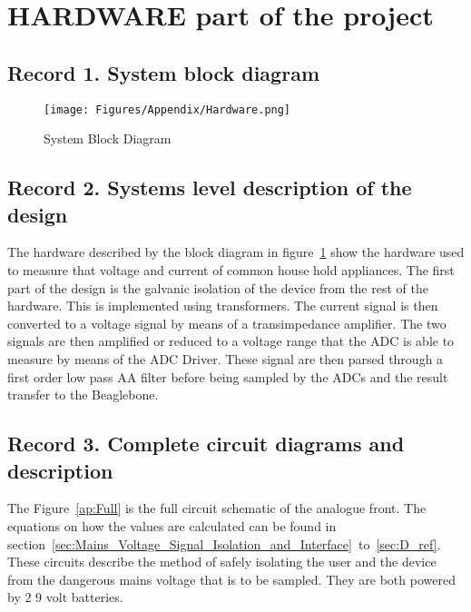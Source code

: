 
\section{HARDWARE part of the project}

\subsection{Record 1. System block diagram}

\begin{figure}[H]
    \centering
    \texttt{[image: Figures/Appendix/Hardware.png]}
    \caption{System Block Diagram}
    \label{fig:Hardware}
\end{figure}


\subsection{Record 2.  Systems level description of the design}

The hardware described by the block diagram in figure~\ref{fig:Hardware} show the hardware used to measure that voltage and current of common house hold appliances. The first part of the design is the galvanic isolation of the device from the rest of the hardware. This is implemented using transformers. The current signal is then converted to a voltage signal by means of a transimpedance amplifier. The two signals are then amplified or reduced to a voltage range that the ADC is able to measure by means of the ADC Driver. These signal are then parsed through a first order low pass AA filter before being sampled by the ADCs and the result transfer to the Beaglebone.


\subsection{Record 3. Complete circuit diagrams and description}


The Figure~\ref{ap:Full} is the full circuit schematic of the analogue front. The equations on how the values are calculated can be found in section~\ref{sec:Mains_Voltage_Signal_Isolation_and_Interface}~to~\ref{sec:D_ref}. These circuits describe the method of safely isolating the user and the device from the dangerous mains voltage that is to be sampled. They are both powered by 2 9 volt batteries. 

